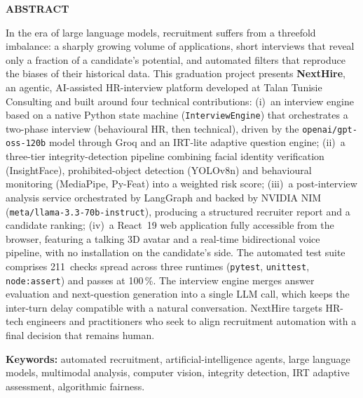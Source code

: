 \newpage
\begin{center}\textbf{\large ABSTRACT}\end{center}
\bigskip

\begin{sloppypar}
In the era of large language models, recruitment suffers from a threefold imbalance: a sharply
growing volume of applications, short interviews that reveal only a fraction of a candidate's
potential, and automated filters that reproduce the biases of their historical data. This
graduation project presents \textbf{NextHire}, an agentic, AI-assisted HR-interview platform
developed at Talan Tunisie Consulting and built around four technical contributions:
(i)~an interview engine based on a native Python state machine (\texttt{InterviewEngine}) that
orchestrates a two-phase interview (behavioural HR, then technical), driven by the
\texttt{openai/\allowbreak gpt-oss-120b} model through Groq and an IRT-lite adaptive question
engine; (ii)~a three-tier integrity-detection pipeline combining facial identity verification
(InsightFace), prohibited-object detection (YOLOv8n) and behavioural monitoring (MediaPipe,
Py-Feat) into a weighted risk score; (iii)~a post-interview analysis service orchestrated by
LangGraph and backed by NVIDIA NIM (\texttt{meta/\allowbreak llama-3.3-\allowbreak 70b-\allowbreak instruct}),
producing a structured recruiter report and a candidate ranking; (iv)~a React~19 web application
fully accessible from the browser, featuring a talking 3D avatar and a real-time bidirectional
voice pipeline, with no installation on the candidate's side. The automated test suite comprises
211~checks spread across three runtimes (\texttt{pytest}, \texttt{unittest}, \texttt{node:assert})
and passes at 100\,\%. The interview engine merges answer evaluation and next-question generation
into a single LLM call, which keeps the inter-turn delay compatible with a natural conversation.
NextHire targets HR-tech engineers and practitioners who seek to align recruitment automation with
a final decision that remains human.

\bigskip
\noindent\textbf{Keywords:} automated recruitment, artificial-intelligence agents, large language
models, multimodal analysis, computer vision, integrity detection, IRT adaptive assessment,
algorithmic fairness.
\end{sloppypar}
